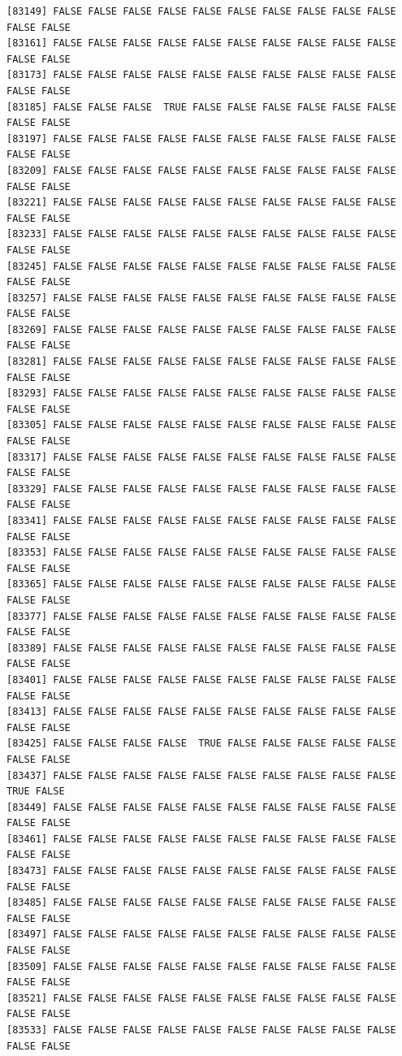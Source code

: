 \documentclass[
  a4paper,
  DIV=11,
  numbers=noendperiod]{scrartcl}
\begin{document}
\begin{verbatim}
[83149] FALSE FALSE FALSE FALSE FALSE FALSE FALSE FALSE FALSE FALSE FALSE FALSE
[83161] FALSE FALSE FALSE FALSE FALSE FALSE FALSE FALSE FALSE FALSE FALSE FALSE
[83173] FALSE FALSE FALSE FALSE FALSE FALSE FALSE FALSE FALSE FALSE FALSE FALSE
[83185] FALSE FALSE FALSE  TRUE FALSE FALSE FALSE FALSE FALSE FALSE FALSE FALSE
[83197] FALSE FALSE FALSE FALSE FALSE FALSE FALSE FALSE FALSE FALSE FALSE FALSE
[83209] FALSE FALSE FALSE FALSE FALSE FALSE FALSE FALSE FALSE FALSE FALSE FALSE
[83221] FALSE FALSE FALSE FALSE FALSE FALSE FALSE FALSE FALSE FALSE FALSE FALSE
[83233] FALSE FALSE FALSE FALSE FALSE FALSE FALSE FALSE FALSE FALSE FALSE FALSE
[83245] FALSE FALSE FALSE FALSE FALSE FALSE FALSE FALSE FALSE FALSE FALSE FALSE
[83257] FALSE FALSE FALSE FALSE FALSE FALSE FALSE FALSE FALSE FALSE FALSE FALSE
[83269] FALSE FALSE FALSE FALSE FALSE FALSE FALSE FALSE FALSE FALSE FALSE FALSE
[83281] FALSE FALSE FALSE FALSE FALSE FALSE FALSE FALSE FALSE FALSE FALSE FALSE
[83293] FALSE FALSE FALSE FALSE FALSE FALSE FALSE FALSE FALSE FALSE FALSE FALSE
[83305] FALSE FALSE FALSE FALSE FALSE FALSE FALSE FALSE FALSE FALSE FALSE FALSE
[83317] FALSE FALSE FALSE FALSE FALSE FALSE FALSE FALSE FALSE FALSE FALSE FALSE
[83329] FALSE FALSE FALSE FALSE FALSE FALSE FALSE FALSE FALSE FALSE FALSE FALSE
[83341] FALSE FALSE FALSE FALSE FALSE FALSE FALSE FALSE FALSE FALSE FALSE FALSE
[83353] FALSE FALSE FALSE FALSE FALSE FALSE FALSE FALSE FALSE FALSE FALSE FALSE
[83365] FALSE FALSE FALSE FALSE FALSE FALSE FALSE FALSE FALSE FALSE FALSE FALSE
[83377] FALSE FALSE FALSE FALSE FALSE FALSE FALSE FALSE FALSE FALSE FALSE FALSE
[83389] FALSE FALSE FALSE FALSE FALSE FALSE FALSE FALSE FALSE FALSE FALSE FALSE
[83401] FALSE FALSE FALSE FALSE FALSE FALSE FALSE FALSE FALSE FALSE FALSE FALSE
[83413] FALSE FALSE FALSE FALSE FALSE FALSE FALSE FALSE FALSE FALSE FALSE FALSE
[83425] FALSE FALSE FALSE FALSE  TRUE FALSE FALSE FALSE FALSE FALSE FALSE FALSE
[83437] FALSE FALSE FALSE FALSE FALSE FALSE FALSE FALSE FALSE FALSE  TRUE FALSE
[83449] FALSE FALSE FALSE FALSE FALSE FALSE FALSE FALSE FALSE FALSE FALSE FALSE
[83461] FALSE FALSE FALSE FALSE FALSE FALSE FALSE FALSE FALSE FALSE FALSE FALSE
[83473] FALSE FALSE FALSE FALSE FALSE FALSE FALSE FALSE FALSE FALSE FALSE FALSE
[83485] FALSE FALSE FALSE FALSE FALSE FALSE FALSE FALSE FALSE FALSE FALSE FALSE
[83497] FALSE FALSE FALSE FALSE FALSE FALSE FALSE FALSE FALSE FALSE FALSE FALSE
[83509] FALSE FALSE FALSE FALSE FALSE FALSE FALSE FALSE FALSE FALSE FALSE FALSE
[83521] FALSE FALSE FALSE FALSE FALSE FALSE FALSE FALSE FALSE FALSE FALSE FALSE
[83533] FALSE FALSE FALSE FALSE FALSE FALSE FALSE FALSE FALSE FALSE FALSE FALSE

\end{verbatim}
\end{document}
